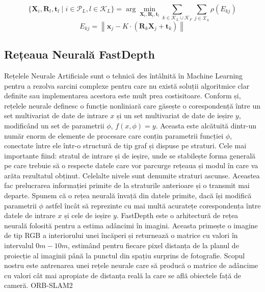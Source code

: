 \documentclass[12pt,a4paper]{report}
\begin{document}
\begin{equation}
\{\mathbf{X}_i, \mathbf{R}_l, \mathbf{t}_l \mid i \in \mathcal{P}_L, l \in \mathcal{K}_L\} = \arg \min_{\mathbf{X}_i, \mathbf{R}_l, \mathbf{t}_l} \sum_{k \in \mathcal{K}_L \cup \mathcal{K}_F} \sum_{j \in \mathcal{X}_k} \rho(E_{kj})
\end{equation}
\begin{equation}  
E_{kj} = \left\| \mathbf{x}_{j} - K \cdot \left(\mathbf{R}_k \mathbf{X}_j + \mathbf{t}_k\right) \right\|
\end{equation}

\subsection{Rețeaua Neurală FastDepth}
Rețelele Neurale Artificiale sunt o tehnică des întâlnită în Machine Learning pentru a rezolva 
sarcini complexe pentru care nu există soluții algoritmice clar definite sau implementarea acestora 
este mult prea costisitoare. Conform\cite{GURESEN2011426} și\cite{prince2023understanding}, rețelele neurale definesc o funcție nonliniară care găsește o 
corespondență între un set multivariat de date de intrare \(x\) și un set multivariat de 
date de ieșire \(y\), modificând un set de parametrii $ \phi $, $ f(x, \phi) = y $. Aceasta este
alcătuită dintr-un număr enorm de elemente de procesare care conțin parametrii funcției $ \phi $,
conectate între ele într-o structură de tip graf și dispuse pe straturi. Cele mai importante fiind: stratul de intrare
și de ieșire, unde se stabilește forma generală pe care trebuie să o respecte datele care vor
parcurge rețeaua și modul în care va arăta rezultatul obținut. Celelalte nivele sunt denumite 
straturi ascunse. Aceastea fac prelucrarea informației primite de la straturile anterioare 
și o transmit mai departe. Spunem că o rețea neurală învață din datele primite, dacă își 
modifică parametrii $ \phi $ astfel încât să reprezinte cu mai multă acuratețe corespondența
între datele de intrare \(x\) și cele de ieșire \(y\).
FastDepth\cite{fast} este o arhitectură de rețea neurală folosită pentru a estima adâncimi în imagini. 
Aceasta primește o imagine de tip RGB a interiorului unei încăperi și returnează o matrice
cu valori în intervalul $0m - 10m$, estimând pentru fiecare pixel distanța de la
planul de proiecție al imaginii până la punctul din spațiu surprins de fotografie. Scopul nostru
este antrenarea unei rețele neurale care să producă o matrice de adâncime cu valori cât mai 
apropiate de distanța reală la care se află obiectele față de cameră. ORB-SLAM2
\end{document}
